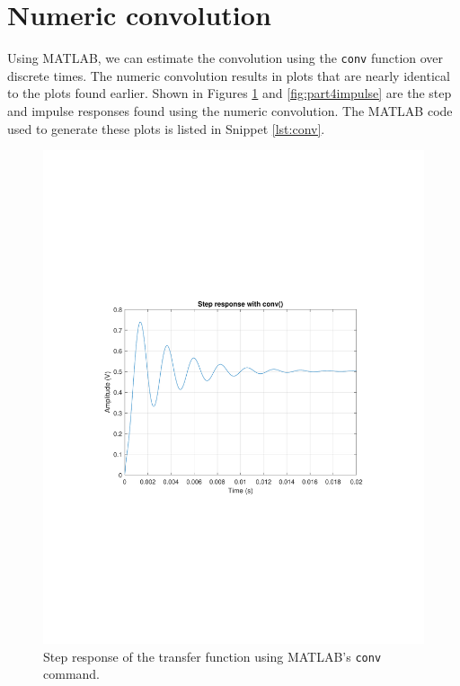 \documentclass{homework}
\begin{document}
	\section{Numeric convolution}
	Using MATLAB, we can estimate the convolution using the \texttt{conv} function over discrete times. The numeric convolution results in plots that are nearly identical to the plots found earlier. Shown in Figures \ref{fig:part4step} and \ref{fig:part4impulse} are the step and impulse responses found using the numeric convolution. The MATLAB code used to generate these plots is listed in Snippet \ref{lst:conv}.
	
	\begin{figure}[H]
		\centering
		\includegraphics[width=0.7\linewidth,clip,trim=4cm 8.5cm 3cm 8.5cm]{part4_step}
		\caption{Step response of the transfer function using MATLAB's \texttt{conv} command.}
		\label{fig:part4step}
	\end{figure}
	\vspace{-1em}
\end{document}
